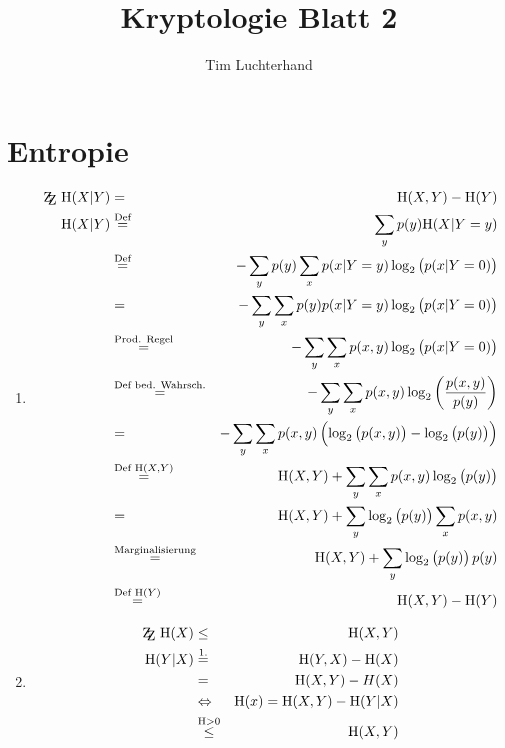 \documentclass[DIN, pagenumber=false, fontsize=11pt, parskip=half]{scrartcl}
\title{Kryptologie Blatt 2}
\author{Tim Luchterhand}
\newcommand{\ZZ}{\mathrm{Z\kern-.3em\raise-0.5ex\hbox{Z}}}
\newcommand{\Ent}{\text{H}}
\begin{document}
    \maketitle
    \setcounter{section}{1}
    \section{Entropie}
    \begin{enumerate}
        \item 
            \begin{eqnarray*}
                \ZZ \ \Ent(X | Y) &=& \Ent(X, Y) - \Ent(Y) \\
                \Ent(X | Y) &\stackrel{\text{Def}}{=}& \sum_y{p(y) \Ent(X | Y = y)} \\
                &\stackrel{\text{Def}}{=}& - \sum_y{p(y) \sum_x{p(x | Y = y) \log_2\left(p(x | Y = 0)\right)}} \\
                &=& - \sum_y{\sum_x{p(y) p(x | Y = y) \log_2\left(p(x | Y = 0)\right)}} \\
                &\stackrel{\text{Prod. Regel}}{=}& - \sum_y{\sum_x{p(x, y) \log_2\left(p(x | Y = 0)\right)}} \\
                &\stackrel{\text{Def bed. Wahrsch.}}{=}& - \sum_y{\sum_x{p(x, y) \log_2\left(\frac{p(x,y)}{p(y)}\right)}} \\
                &=& - \sum_y{\sum_x{p(x, y) \left(\log_2\left(p(x, y)\right) - \log_2\left(p(y)\right)\right)}} \\
                &\stackrel{\text{Def } \Ent(X, Y)}{=}& \Ent(X, Y) + \sum_y{\sum_x{p(x, y) \log_2\left(p(y)\right)}} \\
                &=& \Ent(X, Y) + \sum_y{\log_2\left(p(y)\right) \sum_x{p(x, y) }} \\
                &\stackrel{\text{Marginalisierung}}{=}& \Ent(X, Y) + \sum_y{\log_2\left(p(y)\right) p(y)} \\
                &\stackrel{\text{Def } \Ent(Y)}{=}& \Ent(X, Y) - \Ent(Y)
            \end{eqnarray*}
        \item
            \begin{eqnarray*}
                \ZZ \ \Ent(X) &\leq& \Ent(X, Y) \\
                \Ent(Y | X) &\stackrel{1.}{=}& \Ent(Y, X) - \Ent(X) \\
                &=& \Ent(X, Y) - H(X) \\
                &\Leftrightarrow& \Ent(x) = \Ent(X, Y) - \Ent(Y | X) \\
                &\stackrel{\Ent > 0}{\leq}& \Ent(X, Y)
            \end{eqnarray*}
    \end{enumerate}
\end{document}

